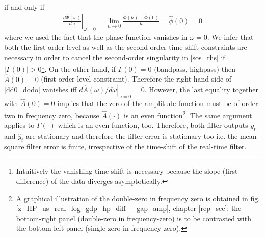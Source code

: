 \documentclass[a4paper]{book}
\begin{document}
if and only if
\begin{eqnarray}\label{soar}
\left.\frac{d\hat{\Phi}(\omega)}{d\omega}\right|_{\omega=0}=\lim_{h\to
0}\frac{\hat{\Phi}(h)-\hat{\Phi}(0)}{h}=\hat{\phi}(0)=0
\end{eqnarray}
where we used the fact that the phase function vanishes in 
\(\omega=0\). We infer that both the first order level as well as the second-order time-shift constraints are necessary in order to cancel the second-order singularity in \ref{sos_rhs} if $|\Gamma(0)|>0$\footnote{Intuitively the vanishing time-shift is necessary because the slope (first difference) of the data diverges asymptotically.}. On the other hand, if \(\Gamma(0)=0\) (bandpass, highpass) then $\hat{A}(0)=0$ (first order level constraint). Therefore the right-hand side of \ref{dd0_dodo} vanishes iff 
\(\left.d\hat{A}(\omega)/d\omega\right|_{\omega=0}=0\). However, the last equality together with $\hat{A}(0)=0$ implies that the zero of the amplitude function must be of order two in frequency zero, because $\hat{A}(\cdot)$ is an even function\footnote{A graphical illustration of the double-zero in frequency zero is obtained in fig.\ref{z_HP_us_real_log_gdp_hp_diff__gap_amp}, chapter \ref{rep_sec}: the bottom-right panel (double-zero in frequency-zero) is to be contrasted with the bottom-left panel (single zero in frequency zero).}. The same argument applies to $\Gamma(\cdot)$ which is an even function, too. Therefore, both filter outputs $y_t$ and $\hat{y}_t$ are stationary and therefore the filter-error is stationary too i.e. the mean-square filter error is finite, irrespective of the time-shift of the real-time filter.\\
\end{document}
